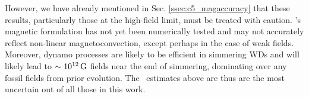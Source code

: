 


However, we have already mentioned in Sec. \ref{ssec:c5_magaccuracy} that these results, particularly those at the high-field limit, must be treated with caution.  \citeal{stev79}'s magnetic formulation has not yet been numerically tested and may not accurately reflect non-linear magnetoconvection, except perhaps in the case of weak fields.  Moreover, dynamo processes are likely to be efficient in simmering WDs and will likely lead to $\sim10^{12}\,\mathrm{G}$ fields near the end of simmering, dominating over any fossil fields from prior evolution.  The \Mcrit\ estimates above are thus are the most uncertain out of all those in this work.  





